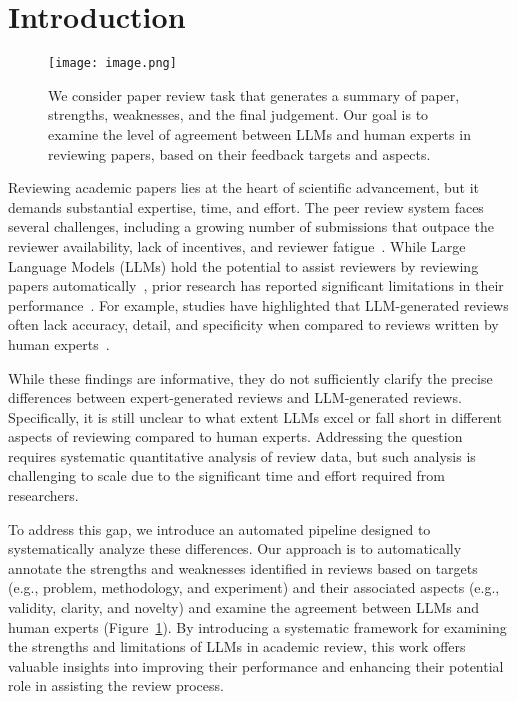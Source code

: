 \section{Introduction}

\begin{figure}[t]
\centering
\texttt{[image: image.png]}
\caption{We consider paper review task that generates a summary of paper, strengths, weaknesses, and the final judgement. Our goal is to examine the level of agreement between LLMs and human experts in reviewing papers, based on their feedback targets and aspects.}
\label{fig:task}
\end{figure}


Reviewing academic papers lies at the heart of scientific advancement, but it demands substantial expertise, time, and effort. The peer review system faces several challenges, including a growing number of submissions that outpace the reviewer availability, lack of incentives, and reviewer fatigue~\citep{tropini2023time, horta2024crisis, hossain2025llmsmetareviewersassistantscase}. While Large Language Models (LLMs) hold the potential to assist reviewers by reviewing papers automatically~\citep{Hosseini2023FightingRF, Robertson2023GPT4IS}, prior research has reported significant limitations in their performance~\citep{du2024llms, liang2024can, zhou2024llm}. For example, studies have highlighted that LLM-generated reviews often lack accuracy, detail, and specificity when compared to reviews written by human experts~\citep{zhou2024llm, mostafapour2024evaluating}. 

While these findings are informative, they do not sufficiently clarify the precise differences between expert-generated reviews and LLM-generated reviews. Specifically, it is still unclear to what extent LLMs excel or fall short in different aspects of reviewing compared to human experts. Addressing the question requires systematic quantitative analysis of review data, but such analysis is challenging to scale due to the significant time and effort required from researchers.



To address this gap, we introduce an automated pipeline designed to systematically analyze these differences. Our approach is to automatically annotate the strengths and weaknesses identified in reviews based on targets (e.g., problem, methodology, and experiment) and their associated aspects (e.g., validity, clarity, and novelty) and examine the agreement between LLMs and human experts (Figure~\ref{fig:task}). By introducing a systematic framework for examining the strengths and limitations of LLMs in academic review, this work offers valuable insights into improving their performance and enhancing their potential role in assisting the review process.


